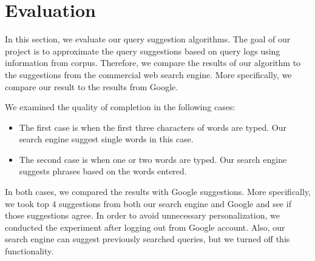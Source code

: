 \documentclass{article}
\begin{document}

		

\section{Evaluation}

In this section, we evaluate our query suggestion algorithms. The goal of our project is to approximate the query suggestions based on query logs using information from corpus. Therefore, we compare the results of our algorithm to the suggestions from the commercial web search engine. More specifically, we compare our result to the results from Google. 

We examined the quality of completion in the following cases:
\begin{itemize}
\item The first case is when the first three characters of words are typed. Our search engine suggest single words in this case.
\item The second case is when one or two words are typed. Our search engine suggests phrases based on the words entered.
\end{itemize}
In both cases, we compared the results with Google suggestions. More specifically, we took top $4$ suggestions from both our search engine and Google and see if those suggestions agree. In order to avoid unnecessary personalization, we conducted the experiment after logging out from Google account. Also, our search engine can suggest previously searched queries, but we turned off this functionality.
\end{document}
